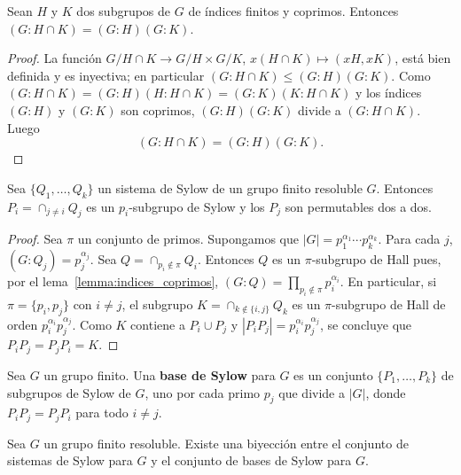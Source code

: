 \begin{lemma}
	\label{lemma:indices_coprimos}
	Sean $H$ y $K$ dos subgrupos de $G$ de índices finitos y coprimos. Entonces
	$(G:H\cap K)=(G:H)(G:K)$.
\end{lemma}

\begin{proof}
	La función $G/H\cap K\to G/H\times G/K$, $x(H\cap K)\mapsto(xH,xK)$, está
	bien definida y es inyectiva; en particular $(G:H\cap K)\leq (G:H)(G:K)$.
	Como $(G:H\cap K)=(G:H)(H:H\cap K)=(G:K)(K:H\cap K)$ y los índices $(G:H)$
	y $(G:K)$ son coprimos, $(G:H)(G:K)$ divide a $(G:H\cap K)$. Luego 
	\[
	(G:H\cap K)=(G:H)(G:K).
	\]
\end{proof}

\begin{lemma}
	\label{lemma:system=>basis}
	Sea $\{Q_1,\dots,Q_k\}$ un sistema de
	Sylow de un grupo finito resoluble $G$.	Entonces
	$P_i=\cap_{j\ne i}Q_j$ es un $p_i$-subgrupo de Sylow y los $P_j$ son
	permutables dos a dos.
\end{lemma}

\begin{proof}
	Sea $\pi$ un conjunto de primos.  Supongamos que $|G|=p_1^{\alpha_1}\cdots
	p_k^{\alpha_k}$. Para cada $j$, $(G:Q_j)=p_j^{\alpha_j}$.  Sea
	$Q=\cap_{p_i\not\in\pi}Q_i$. Entonces $Q$ es un $\pi$-subgrupo de Hall
	pues, por el lema~\ref{lemma:indices_coprimos},
	$(G:Q)=\prod_{p_i\not\in\pi}p_i^{\alpha_i}$. En particular, si
	$\pi=\{p_i,p_j\}$ con $i\ne j$, el subgrupo $K=\cap_{k\not\in\{i,j\}}Q_k$
	es un $\pi$-subgrupo de Hall de orden $p_i^{\alpha_i}p_j^{\alpha_j}$.  Como
	$K$ contiene a $P_i\cup P_j$ y $|P_iP_j|=p_i^{\alpha_i}p_j^{\alpha_j}$, se
	concluye que $P_iP_j=P_jP_i=K$.
\end{proof}

\begin{definition}
	Sea $G$ un grupo finito. Una \textbf{base de Sylow} para $G$ es 
	un conjunto $\{P_1,\dots,P_k\}$ de subgrupos de Sylow de $G$, uno por cada
	primo $p_j$ que divide a $|G|$, donde $P_iP_j=P_jP_i$ para todo $i\ne j$. 
\end{definition}

\begin{proposition}
	\label{proposition:sistemas=bases}
	Sea $G$ un grupo finito resoluble. Existe una biyección entre el conjunto
	de sistemas de Sylow para $G$ y el conjunto de bases de Sylow para $G$. 
\end{proposition}

